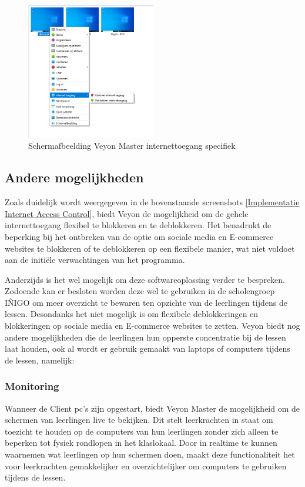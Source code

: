 \begin{figure}[h]
    \centering
    \includegraphics[width=0.5\textwidth]{graphics/SchermafbeeldingInternetToegangSpecifiek.png}
    \caption{Schermafbeelding Veyon Master internettoegang specifiek}
    \label{fig:Schermafbeelding Veyon Master internettoegang specifiek} 
\end{figure}\newpage

\subsection{Andere mogelijkheden}
Zoals duidelijk wordt weergegeven in de bovenstaande screenshots \ref{Implementatie Internet Access Control}, biedt Veyon de mogelijkheid om de gehele internettoegang flexibel te blokkeren en te deblokkeren. Het benadrukt de beperking bij het ontbreken van de optie om sociale media en E-commerce websites te blokkeren of te deblokkeren op een flexibele manier, wat niet voldoet aan de initiële verwachtingen van het programma.\newline

Anderzijds is het wel mogelijk om deze softwareoplossing verder te bespreken. Zodoende kan er besloten worden deze wel te gebruiken in de scholengroep IÑIGO om meer overzicht te bewaren ten opzichte van de leerlingen tijdens de lessen. Desondanks het niet mogelijk is om flexibele deblokkeringen en blokkeringen op sociale media en E-commerce websites te zetten. Veyon biedt nog andere mogelijkheden die de leerlingen hun opperste concentratie bij de lessen laat houden, ook al wordt er gebruik gemaakt van laptops of computers tijdens de lessen, namelijk:

\subsubsection{Monitoring}
Wanneer de Client pc's zijn opgestart, biedt Veyon Master de mogelijkheid om de schermen van leerlingen live te bekijken. Dit stelt leerkrachten in staat om toezicht te houden op de computers van hun leerlingen zonder zich alleen te beperken tot fysiek rondlopen in het klaslokaal. Door in realtime te kunnen waarnemen wat leerlingen op hun schermen doen, maakt deze functionaliteit het voor leerkrachten gemakkelijker en overzichtelijker om computers te gebruiken tijdens de lessen.

